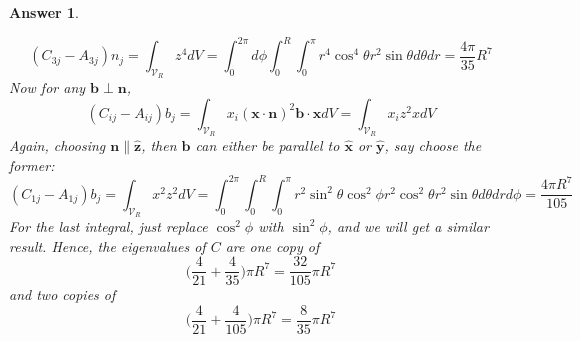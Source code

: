 \documentclass[a4paper]{article}
\newtheorem{ans}{Answer}[section]
\theoremstyle{new}
\begin{document}
\begin{ans}
\begin{enumerate}[label=(\roman*)]
$$(C_{3j}-A_{3j})n_j=\int_{\mathcal{V}_R}z^4dV=\int_0^{2\pi}d\phi\int_0^R\int_0^\pi r^4\cos^4\theta r^2\sin\theta d\theta dr=\frac{4\pi}{35}R^7$$
Now for any $\mathbf{b}\perp\mathbf{n}$,
$$(C_{ij}-A_{ij})b_j=\int_{\mathcal{V}_R}x_i(\mathbf{x}\cdot\mathbf{n})^2\mathbf{b}\cdot\mathbf{x}dV=\int_{\mathcal{V}_R}x_iz^2xdV$$
Again, choosing $\mathbf{n}\parallel\mathbf{\hat{z}}$, then $\mathbf{b}$ can either be parallel to $\mathbf{\hat{x}}$ or $\mathbf{\hat{y}}$, say choose the former:
$$(C_{1j}-A_{1j})b_j=\int_{\mathcal{V}_R}x^2z^2dV=\int_0^{2\pi}\int_0^R\int_0^\pi r^2\sin^2\theta\cos^2\phi r^2\cos^2\theta r^2\sin\theta d\theta dr d\phi=\frac{4\pi R^7}{105}$$
For the last integral, just replace $\cos^2\phi$ with $\sin^2\phi$, and we will get a similar result. Hence, the eigenvalues of $C$ are one copy of $$\bigg(\frac{4}{21}+\frac{4}{35}\bigg)\pi R^7=\frac{32}{105}\pi R^7$$
and two copies of $$\bigg(\frac{4}{21}+\frac{4}{105}\bigg)\pi R^7=\frac{8}{35}\pi R^7$$
\end{enumerate}
\end{ans}
\newpage
\end{document}
